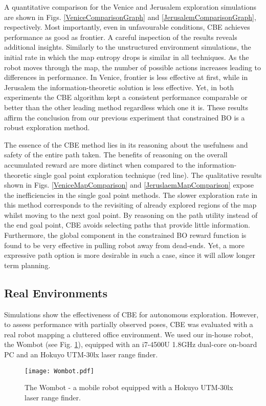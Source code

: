 \documentclass[shortAfour,sageh,times]{sagej_no_sage}
\begin{document}
A quantitative comparison for the Venice and Jerusalem exploration simulations are shown in Figs. \ref{VeniceComparisonGraph} and \ref{JerusalemComparisonGraph}, respectively. Most importantly, even in unfavourable conditions, CBE achieves performance as good as frontier. A careful inspection of the results reveals additional insights. Similarly to the unstructured environment simulations, the initial rate in which the map entropy drops is similar in all techniques. As the robot moves through the map, the number of possible actions increases leading to differences in performance. In Venice, frontier is less effective at first, while in Jerusalem the information-theoretic solution is less effective. Yet, in both experiments the CBE algorithm kept a consistent performance comparable or better than the other leading method regardless which one it is. These results affirm the conclusion from our previous experiment that constrained BO is a robust exploration method. 

The essence of the CBE method lies in its reasoning about the usefulness and safety of the entire path taken. The benefits of reasoning on the overall accumulated reward are more distinct when compared to the information-theoretic single goal point exploration technique (red line). The qualitative results shown in Figs. \ref{VeniceMapComparison} and \ref{JeruslaemMapComparison} expose the inefficiencies in the single goal point methods. The slower exploration rate in this method corresponds to the revisiting of already explored regions of the map whilst moving to the next goal point. By reasoning on the path utility instead of the end goal point, CBE avoids selecting paths that provide little information. Furthermore, the global component in the constrained BO reward function is found to be very effective in pulling robot away from dead-ends. Yet, a more expressive path option is more desirable in such a case, since it will allow longer term planning.

\subsection{Real Environments}

Simulations show the effectiveness of CBE for autonomous exploration. However, to assess performance with partially observed poses, CBE was evaluated with a real robot mapping a cluttered office environment. We used our in-house robot, the Wombot (see Fig. \ref{fig:Wombot}), equipped with an i7-4500U 1.8GHz dual-core on-board PC and an Hokuyo UTM-30lx laser range finder. 
  \begin{figure}[htbp]
  	
  	\centering
  	
  	\texttt{[image: Wombot.pdf]}
  	
  	\caption{The Wombot - a mobile robot equipped with a Hokuyo UTM-30lx laser range finder.}
  	\label{fig:Wombot}
  \end{figure}
  
\end{document}
